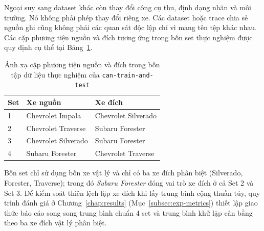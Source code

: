 \documentclass[12pt, a4paper, reqno, oneside]{book}
\begin{document}
Ngoại suy sang dataset khác còn thay đổi công cụ thu, định dạng nhãn và môi trường. Nó không phải phép thay đổi riêng xe. Các dataset hoặc trace chia sẻ nguồn ghi cũng không phải các quan sát độc lập chỉ vì mang tên tệp khác nhau. Các cặp phương tiện nguồn và đích tương ứng trong bốn set thực nghiệm được quy định cụ thể tại Bảng~\ref{tab:vehicle_pairs}.

\begin{table}[htbp]\centering
\caption[Ánh xạ cặp phương tiện nguồn và đích trong bốn tập dữ liệu]{Ánh xạ cặp phương tiện nguồn và đích trong bốn tập dữ liệu thực nghiệm của \texttt{can-train-and-test}}\label{tab:vehicle_pairs}
\begin{tabular}{lll}\toprule Set & Xe nguồn & Xe đích\\\midrule
1 & Chevrolet Impala & Chevrolet Silverado\\
2 & Chevrolet Traverse & Subaru Forester\\
3 & Chevrolet Silverado & Subaru Forester\\
4 & Subaru Forester & Chevrolet Traverse\\\bottomrule\end{tabular}
\end{table}

Bốn set chỉ sử dụng bốn xe vật lý và chỉ có ba xe đích phân biệt (Silverado, Forester, Traverse); trong đó \textit{Subaru Forester} đóng vai trò xe đích ở cả Set 2 và Set 3. Để kiểm soát thiên lệch lặp xe đích khi lấy trung bình cộng thuần túy, quy trình đánh giá ở Chương~\ref{chap:results} (Mục~\ref{subsec:exp-metrics}) thiết lập giao thức báo cáo song song trung bình chuẩn 4 set và trung bình khử lặp cân bằng theo ba xe đích vật lý phân biệt.
\end{document}
